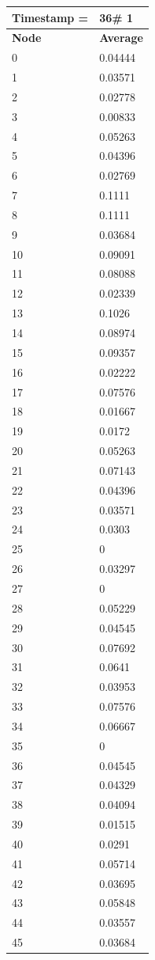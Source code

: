 \begin{tabular}{|l||l|}
\hline
\textbf{Timestamp =} & \textbf{36}\# 1\\\hline
	\textbf{Node} & \textbf{Average} \\ \hline
\hline
	0 & 0.04444 \\ \hline
	1 & 0.03571 \\ \hline
	2 & 0.02778 \\ \hline
	3 & 0.00833 \\ \hline
	4 & 0.05263 \\ \hline
	5 & 0.04396 \\ \hline
	6 & 0.02769 \\ \hline
	7 & 0.1111 \\ \hline
	8 & 0.1111 \\ \hline
	9 & 0.03684 \\ \hline
	10 & 0.09091 \\ \hline
	11 & 0.08088 \\ \hline
	12 & 0.02339 \\ \hline
	13 & 0.1026 \\ \hline
	14 & 0.08974 \\ \hline
	15 & 0.09357 \\ \hline
	16 & 0.02222 \\ \hline
	17 & 0.07576 \\ \hline
	18 & 0.01667 \\ \hline
	19 & 0.0172 \\ \hline
	20 & 0.05263 \\ \hline
	21 & 0.07143 \\ \hline
	22 & 0.04396 \\ \hline
	23 & 0.03571 \\ \hline
	24 & 0.0303 \\ \hline
	25 & 0 \\ \hline
	26 & 0.03297 \\ \hline
	27 & 0 \\ \hline
	28 & 0.05229 \\ \hline
	29 & 0.04545 \\ \hline
	30 & 0.07692 \\ \hline
	31 & 0.0641 \\ \hline
	32 & 0.03953 \\ \hline
	33 & 0.07576 \\ \hline
	34 & 0.06667 \\ \hline
	35 & 0 \\ \hline
	36 & 0.04545 \\ \hline
	37 & 0.04329 \\ \hline
	38 & 0.04094 \\ \hline
	39 & 0.01515 \\ \hline
	40 & 0.0291 \\ \hline
	41 & 0.05714 \\ \hline
	42 & 0.03695 \\ \hline
	43 & 0.05848 \\ \hline
	44 & 0.03557 \\ \hline
	45 & 0.03684 \\ \hline
\end{tabular}
